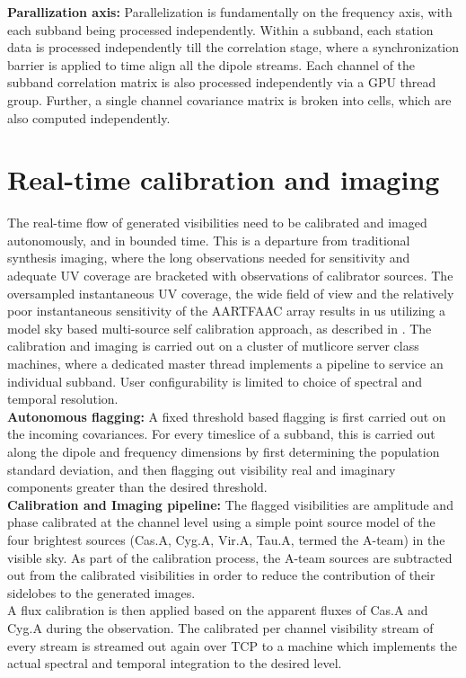 \documentclass{ws-jai}
\begin{document}
\noindent \textbf {Parallization axis:} Parallelization  is fundamentally on the frequency
axis, with  each subband being  processed independently. Within a  subband, each
station  data is  processed independently  till the  correlation stage,  where a
synchronization barrier  is applied to time  align all the dipole  streams. Each
channel of the subband correlation matrix  is also processed independently via a
GPU thread  group. Further, a  single channel  covariance matrix is  broken into
cells, which are also computed independently.\\


\section {\label{sec:calim} Real-time calibration and imaging}
The real-time  flow of generated visibilities  need to be calibrated  and imaged
autonomously,  and  in bounded  time.   This  is  a departure  from  traditional
synthesis  imaging,  where the  long  observations  needed for  sensitivity  and
adequate UV coverage are bracketed  with observations of calibrator sources. The
oversampled instantaneous UV coverage, the wide field of view and the relatively
poor instantaneous sensitivity  of the AARTFAAC array results in  us utilizing a
model sky  based multi-source self  calibration approach, as described  in \cite
{prasad2014real}.  The  calibration and imaging is  carried out on a  cluster of
mutlicore server  class machines, where  a dedicated master thread  implements a
pipeline to service  an individual subband.  User configurability  is limited to
choice of spectral and temporal resolution.\\

\noindent \textbf {Autonomous flagging:} A fixed threshold based flagging is first carried
out  on the  incoming covariances.  For every  timeslice of  a subband,  this is
carried out along  the dipole and frequency dimensions by  first determining the
population  standard  deviation,  and  then flagging  out  visibility  real  and
imaginary components greater than the desired threshold.\\

\noindent \textbf  {Calibration  and  Imaging  pipeline:}  The  flagged  visibilities  are
amplitude and phase calibrated at the  channel level using a simple point source
model of  the four  brightest sources  (Cas.A, Cyg.A,  Vir.A, Tau.A,  termed the
A-team)  in the  visible sky.  As part  of the  calibration process,  the A-team
sources are subtracted  out from the calibrated visibilities in  order to reduce
the  contribution  of  their  sidelobes   to  the  generated  images.\\  A  flux
calibration is  then applied  based on  the apparent fluxes  of Cas.A  and Cyg.A
during the  observation. The calibrated  per channel visibility stream  of every
stream is streamed out  again over TCP to a machine  which implements the actual
spectral and temporal integration to the desired level.\\
\end{document}
